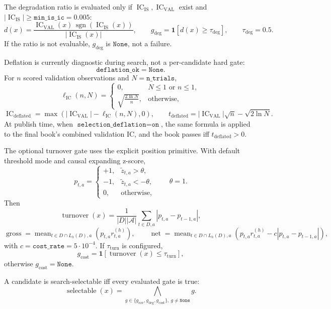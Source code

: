\documentclass[11pt]{article}
\newcommand{\IC}{\operatorname{IC}}
\newcommand{\sgn}{\operatorname{sgn}}
\newcommand{\ind}{\mathbf{1}}
\begin{document}
The degradation ratio is evaluated only if
\(\IC_{\mathrm{IS}},\IC_{\mathrm{VAL}}\) exist and
\(|\IC_{\mathrm{IS}}|\ge\texttt{min\_is\_ic}=0.005\):
\[
  d(x)=
  \frac{\IC_{\mathrm{VAL}}(x)\,\sgn(\IC_{\mathrm{IS}}(x))}
       {|\IC_{\mathrm{IS}}(x)|},
  \qquad
  g_{\mathrm{deg}}=\ind[d(x)\ge \tau_{\mathrm{deg}}],
  \qquad \tau_{\mathrm{deg}}=0.5.
\]
If the ratio is not evaluable, \(g_{\mathrm{deg}}\) is \(\texttt{None}\), not a
failure.

Deflation is currently diagnostic during search, not a per-candidate hard gate:
\[
  \texttt{deflation\_ok}=\texttt{None}.
\]
For \(n\) scored validation observations and \(N=\texttt{n\_trials}\),
\[
  \ell_{\IC}(n,N)=
  \begin{cases}
    0, & N\le 1 \text{ or } n\le 1,\\
    \sqrt{\frac{2\ln N}{n}}, & \text{otherwise},
  \end{cases}
\]
\[
  \IC_{\mathrm{deflated}}
  =
  \max\left(|\IC_{\mathrm{VAL}}|-\ell_{\IC}(n,N),0\right),
  \qquad
  t_{\mathrm{deflated}}
  =
  |\IC_{\mathrm{VAL}}|\sqrt n-\sqrt{2\ln N}.
\]
At publish time, when \(\texttt{selection\_deflation}=\texttt{on}\), the same
formula is applied to the final book's combined validation IC, and the book
passes iff \(t_{\mathrm{deflated}}>0\).

The optional turnover gate uses the explicit position primitive.  With default
threshold mode and causal expanding z-score,
\[
  p_{t,a}=
  \begin{cases}
    +1, & \tilde z_{t,a}>\theta,\\
    -1, & \tilde z_{t,a}<-\theta,\\
    0, & \text{otherwise},
  \end{cases}
  \qquad \theta=1.
\]
Then
\[
  \operatorname{turnover}(x)=
  \frac{1}{|D||\mathcal A|}
  \sum_{t\in D,a}|p_{t,a}-p_{t-1,a}|,
\]
\[
  \operatorname{gross}
  =
  \operatorname{mean}_{t\in D\cap L_h(D),a}(p_{t,a}r^{(h)}_{t,a}),
  \qquad
  \operatorname{net}
  =
  \operatorname{mean}_{t\in D\cap L_h(D),a}
  \left(p_{t,a}r^{(h)}_{t,a}-c|p_{t,a}-p_{t-1,a}|\right),
\]
with \(c=\texttt{cost\_rate}=5\cdot 10^{-4}\).  If
\(\tau_{\mathrm{turn}}\) is configured,
\[
  g_{\mathrm{cost}}=\ind[\operatorname{turnover}(x)\le \tau_{\mathrm{turn}}],
\]
otherwise \(g_{\mathrm{cost}}=\texttt{None}\).

A candidate is search-selectable iff every evaluated gate is true:
\[
  \operatorname{selectable}(x)
  =
  \bigwedge_{g\in\{g_{\mathrm{cov}},g_{\mathrm{deg}},g_{\mathrm{cost}}\},\ g\neq\texttt{None}} g.
\]
\end{document}
